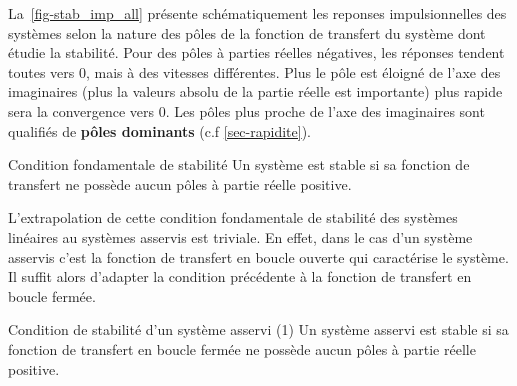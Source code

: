 \newpage
\pagestyle{fancy}
\captionsetup{width=\linewidth}
La~\cref{fig-stab_imp_all} présente schématiquement les reponses impulsionnelles 
des systèmes selon la nature des pôles de la fonction de transfert du système 
dont étudie la stabilité. Pour des pôles à parties réelles négatives, les 
réponses tendent toutes vers 0, mais à des vitesses différentes. Plus le pôle
est éloigné de l'axe des imaginaires (plus la valeurs absolu de la partie 
réelle est importante) plus rapide sera la convergence vers 0. Les pôles
plus proche de l'axe des imaginaires sont qualifiés de \textbf{pôles dominants}
(c.f \cref{sec-rapidite}).
\begin{criteria}{Condition fondamentale de stabilité}
    Un système est stable si sa fonction de transfert ne possède aucun 
    pôles à partie réelle positive.
\end{criteria}
%    
L'extrapolation de cette condition fondamentale de stabilité des systèmes 
linéaires au systèmes asservis est triviale. En effet, dans le cas d'un 
système asservis c'est la fonction de transfert en boucle ouverte qui 
caractérise le système. Il suffit alors d'adapter la condition précédente à la
fonction de transfert en boucle fermée.
\begin{criteria}{Condition de stabilité d'un système asservi (1)}
         Un système asservi est stable si sa fonction de transfert en 
         boucle fermée ne possède aucun pôles à partie réelle positive.
\end{criteria}
